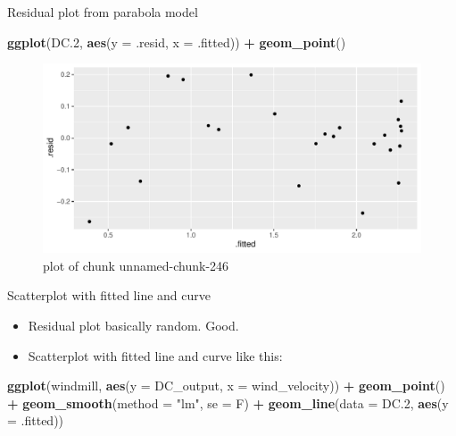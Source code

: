 \documentclass[ignorenonframetext,]{beamer}
\newenvironment{Shaded}{\begin{snugshade}}{\end{snugshade}}
\newcommand{\DataTypeTok}[1]{\textcolor[rgb]{0.13,0.29,0.53}{#1}}
\newcommand{\FloatTok}[1]{\textcolor[rgb]{0.00,0.00,0.81}{#1}}
\newcommand{\KeywordTok}[1]{\textcolor[rgb]{0.13,0.29,0.53}{\textbf{#1}}}
\newcommand{\NormalTok}[1]{#1}
\newcommand{\OperatorTok}[1]{\textcolor[rgb]{0.81,0.36,0.00}{\textbf{#1}}}
\newcommand{\StringTok}[1]{\textcolor[rgb]{0.31,0.60,0.02}{#1}}
\providecommand{\tightlist}{%
  \setlength{\itemsep}{0pt}\setlength{\parskip}{0pt}}
\begin{document}
\begin{frame}[fragile]{Residual plot from parabola model}
\protect\hypertarget{residual-plot-from-parabola-model}{}

\begin{Shaded}
\begin{Highlighting}[]
\KeywordTok{ggplot}\NormalTok{(DC}\FloatTok{.2}\NormalTok{, }\KeywordTok{aes}\NormalTok{(}\DataTypeTok{y =}\NormalTok{ .resid, }\DataTypeTok{x =}\NormalTok{ .fitted)) }\OperatorTok{+}
\StringTok{  }\KeywordTok{geom_point}\NormalTok{()}
\end{Highlighting}
\end{Shaded}

\begin{figure}
\centering
\includegraphics{figure/unnamed-chunk-246-1.pdf}
\caption{plot of chunk unnamed-chunk-246}
\end{figure}

\end{frame}

\begin{frame}[fragile]{Scatterplot with fitted line and curve}
\protect\hypertarget{scatterplot-with-fitted-line-and-curve}{}

\begin{itemize}
\tightlist
\item
  Residual plot basically random. Good.
\item
  Scatterplot with fitted line and curve like this:
\end{itemize}

\begin{Shaded}
\begin{Highlighting}[]
\KeywordTok{ggplot}\NormalTok{(windmill, }\KeywordTok{aes}\NormalTok{(}\DataTypeTok{y =}\NormalTok{ DC_output, }\DataTypeTok{x =}\NormalTok{ wind_velocity)) }\OperatorTok{+}
\StringTok{  }\KeywordTok{geom_point}\NormalTok{() }\OperatorTok{+}\StringTok{ }\KeywordTok{geom_smooth}\NormalTok{(}\DataTypeTok{method =} \StringTok{"lm"}\NormalTok{, }\DataTypeTok{se =}\NormalTok{ F) }\OperatorTok{+}
\StringTok{  }\KeywordTok{geom_line}\NormalTok{(}\DataTypeTok{data =}\NormalTok{ DC}\FloatTok{.2}\NormalTok{, }\KeywordTok{aes}\NormalTok{(}\DataTypeTok{y =}\NormalTok{ .fitted))}
\end{Highlighting}
\end{Shaded}

\end{frame}
\end{document}
